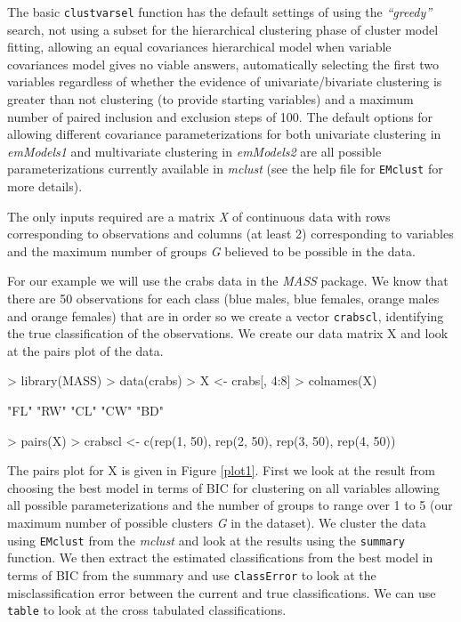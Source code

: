 \documentclass[,12pt]{article}
\newcommand{\Robject}[1]{{\texttt{#1}}}
\newcommand{\Rfunction}[1]{{\texttt{#1}}}
\newcommand{\Rpackage}[1]{{\textit{#1}}}
\newcommand{\Rfunarg}[1]{{\textit{#1}}}
\begin{document}
The basic \Rfunction{clustvarsel}  function has the default settings of using the \Rfunarg{``greedy''} search, not using a subset for the hierarchical clustering phase of cluster model fitting, allowing an equal covariances hierarchical model when variable covariances model gives no viable answers, automatically selecting the first two variables regardless of whether the evidence of univariate/bivariate clustering is greater than not clustering (to provide starting variables) and a maximum number of paired inclusion and exclusion steps of 100. The default options for allowing different covariance parameterizations for both univariate clustering in \Rfunarg{emModels1} and multivariate clustering in \Rfunarg{emModels2} are all possible parameterizations currently available in \Rpackage{mclust} (see the help file for \Rfunction{EMclust} for more details).

The only inputs required are a matrix \Rfunarg{X} of continuous data with rows corresponding to observations and columns (at least 2) corresponding to variables and the maximum number of groups \Rfunarg{G} believed to be possible in the data.

For our example we will use the crabs data in the \Rpackage{MASS} package. We know that there are 50 observations for each class (blue males, blue females, orange males and orange females) that are in order so we create a vector \Robject{crabscl}, identifying the true classification of the observations. We create our data matrix X and look at the pairs plot of the data.

\begin{Schunk}
\begin{Sinput}
> library(MASS)
> data(crabs)
> X <- crabs[, 4:8]
> colnames(X)
\end{Sinput}
\begin{Soutput}
[1] "FL" "RW" "CL" "CW" "BD"

\end{Soutput}
\begin{Sinput}
> pairs(X)
> crabscl <- c(rep(1, 50), rep(2, 50), rep(3, 50), rep(4, 50))
\end{Sinput}
\end{Schunk}
The pairs plot for X is given in Figure \ref{plot1}.
First we look at the result from choosing the best model in terms of BIC for clustering on all variables allowing all possible parameterizations and the number of groups to range over 1 to 5 (our maximum number of possible clusters \Rfunarg{G} in the dataset). We cluster the data using \Rfunction{EMclust} from the \Rpackage{mclust} and look at the results using the \Rfunction{summary} function. We then extract the estimated classifications from the best model in terms of BIC from the summary and use \Rfunction{classError} to look at the misclassification error between the current and true classifications. We can use \Rfunction{table} to look at the cross tabulated classifications.
 
\end{document}
